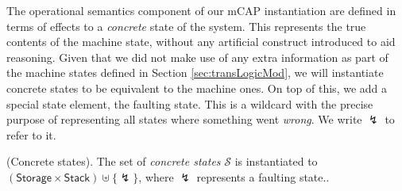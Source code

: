 The operational semantics component of our mCAP instantiation are defined in terms of effects to a \textit{concrete} state of the system. This represents the true contents of the machine state, without any artificial construct introduced to aid reasoning. Given that we did not make use of any extra information as part of the machine states defined in Section \ref{sec:transLogicMod}, we will instantiate concrete states to be equivalent to the machine ones. On top of this, we add a special state element, the faulting state. This is a wildcard with the precise purpose of representing all states where something went \textit{wrong}. We write $\lightning$ to refer to it.
\begin{defn}
	(Concrete states).
	The set of \emph{concrete states} $\mathcal{S}$ is instantiated to $(\mathsf{Storage} \times \mathsf{Stack}) \uplus \{\lightning\}$, where $\lightning$ represents a faulting state..
\end{defn}

